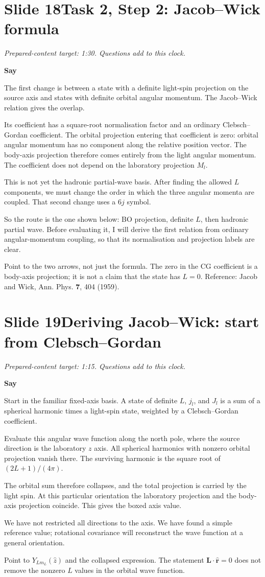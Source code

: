 \documentclass[11pt,a4paper]{article}
\newcommand{\cue}[1]{\begin{private}#1\end{private}}
\newenvironment{speech}{\par\textbf{Say}\par}{\par}
\newcommand{\slidenote}[3]{%
  \clearpage
  \pdfbookmark[1]{Slide #1}{slide-#1}%
  \section*{Slide #1\quad #2}
  \textit{Prepared-content target: #3. Questions add to this clock.}\par
}
\begin{document}
\slidenote{18}{Task 2, Step 2: Jacob--Wick formula}{1:30}
\begin{speech}
The first change is between a state with a definite light-spin
projection on the source axis and states with definite orbital
angular momentum. The Jacob--Wick relation gives the overlap.

Its coefficient has a square-root normalisation factor and an ordinary
Clebsch--Gordan coefficient. The orbital projection entering that
coefficient is zero: orbital angular momentum has no component along
the relative position vector. The body-axis projection therefore
comes entirely from the light angular momentum. The coefficient does
not depend on the laboratory projection $M_l$.

This is not yet the hadronic partial-wave basis. After finding the
allowed $L$ components, we must change the order in which the three
angular momenta are coupled. That second change uses a $6j$ symbol.

So the route is the one shown below: BO projection, definite $L$,
then hadronic partial wave. Before evaluating it, I will derive the
first relation from ordinary angular-momentum coupling, so that its
normalisation and projection labels are clear.
\end{speech}
\cue{Point to the two arrows, not just the formula. The zero in the CG
coefficient is a body-axis projection; it is not a claim that the state
has $L=0$. Reference: Jacob and Wick, Ann. Phys. \textbf{7}, 404 (1959).}

\slidenote{19}{Deriving Jacob--Wick: start from Clebsch--Gordan}{1:15}
\begin{speech}
Start in the familiar fixed-axis basis. A state of definite $L$, $j_l$,
and $J_l$ is a sum of a spherical harmonic times a light-spin state,
weighted by a Clebsch--Gordan coefficient.

Evaluate this angular wave function along the north pole, where the
source direction is the laboratory $z$ axis. All spherical harmonics
with nonzero orbital projection vanish there. The surviving harmonic
is the square root of $(2L+1)/(4\pi)$.

The orbital sum therefore collapses, and the total projection is
carried by the light spin. At this particular orientation the laboratory
projection and the body-axis projection coincide. This gives the boxed
axis value.

We have not restricted all directions to the axis. We have found a
simple reference value; rotational covariance will reconstruct the
wave function at a general orientation.
\end{speech}
\cue{Point to $Y_{Lm_L}(\hat z)$ and the collapsed expression. The statement
$\bm L\cdot\hat{\bm r}=0$ does not remove the nonzero $L$ values in the
orbital wave function.}
\end{document}
